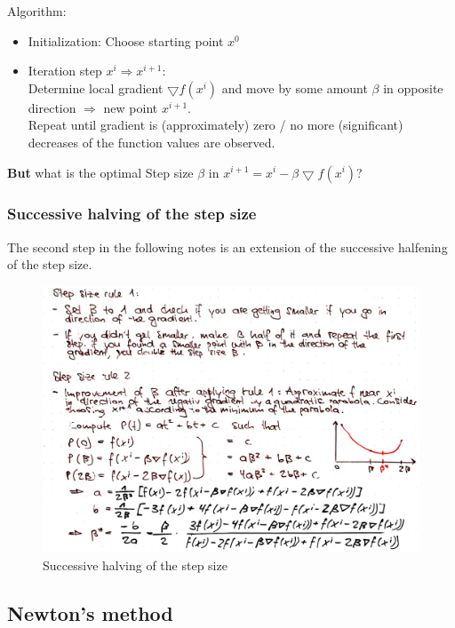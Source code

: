 Algorithm:
\begin{itemize}
    \item Initialization: Choose starting point $x^0$
    \item Iteration step $x^i \Rightarrow x^{i+1}$: \\
    Determine local gradient $\bigtriangledown f(x^i)$ and move by some amount $\beta$ in opposite direction $\Rightarrow$ new point $x^{i+1}$. \\
    Repeat until gradient is (approximately) zero / no more (significant) decreases of the function values are observed.
\end{itemize}

\textbf{But} what is the optimal Step size $\beta$ in $x^{i+1} = x^i - \beta \bigtriangledown f(x^i)$?

\subsubsection{Successive halving of the step size}
The second step in the following notes is an extension of the successive halfening of the step size.

\begin{figure}[H]
\centering
\includegraphics[width=1\textwidth]{figures/stepsizehalfening.png}
\caption{Successive halving of the step size}
\end{figure}

\subsection{Newton’s method}

